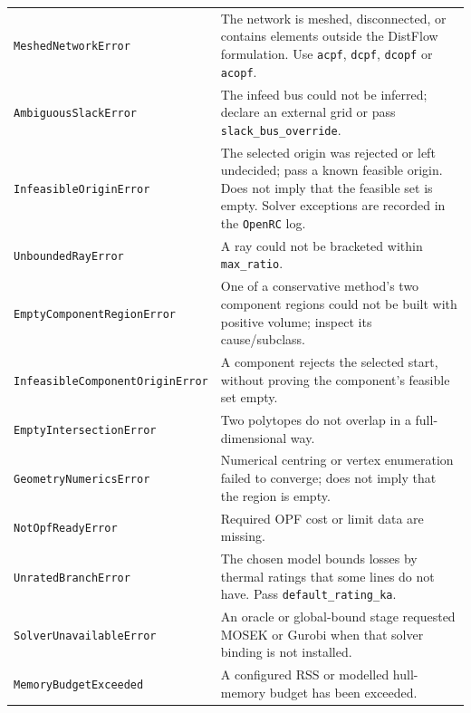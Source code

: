 \documentclass[11pt,a4paper]{report}
\newcommand{\code}[1]{\texttt{\small #1}}
\begin{document}
\begin{center}\small
\begin{tabular}{@{}>{\raggedright\arraybackslash}p{4.8cm}>{\raggedright\arraybackslash}p{9.7cm}@{}}
\toprule
\code{MeshedNetworkError} & The network is meshed, disconnected, or contains
  elements outside the DistFlow formulation. Use \code{acpf}, \code{dcpf},
  \code{dcopf} or \code{acopf}. \\
\code{AmbiguousSlackError} & The infeed bus could not be inferred; declare an
  external grid or pass \code{slack\_bus\_override}. \\
\code{InfeasibleOriginError} & The selected origin was rejected or left
  undecided; pass a known feasible origin. Does not imply that the feasible set
  is empty. Solver exceptions are recorded in the \code{OpenRC} log. \\
\code{UnboundedRayError} & A ray could not be bracketed within
  \code{max\_ratio}. \\
\code{EmptyComponentRegionError} & One of a conservative method's two component
  regions could not be built with positive volume; inspect its cause/subclass. \\
\code{InfeasibleComponent\allowbreak{}OriginError} & A component rejects the
  selected start, without proving the component's feasible set empty. \\
\code{EmptyIntersectionError} & Two polytopes do not overlap in a
  full-dimensional way. \\
\code{GeometryNumericsError} & Numerical centring or vertex enumeration failed
  to converge; does not imply that the region is empty. \\
\code{NotOpfReadyError} & Required OPF cost or limit data are missing. \\
\code{UnratedBranchError} & The chosen model bounds losses by thermal ratings
  that some lines do not have. Pass \code{default\_rating\_ka}. \\
\code{SolverUnavailableError} & An oracle or global-bound stage requested MOSEK
  or Gurobi when that solver binding is not installed. \\
\code{MemoryBudgetExceeded} & A configured RSS or modelled hull-memory budget
  has been exceeded. \\
\bottomrule
\end{tabular}
\end{center}
\end{document}
